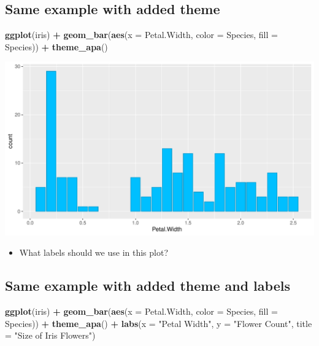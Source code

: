 \documentclass[
]{book}
\newenvironment{Shaded}{\begin{snugshade}}{\end{snugshade}}
\newcommand{\AttributeTok}[1]{\textcolor[rgb]{0.13,0.29,0.53}{#1}}
\newcommand{\FunctionTok}[1]{\textcolor[rgb]{0.13,0.29,0.53}{\textbf{#1}}}
\newcommand{\NormalTok}[1]{#1}
\newcommand{\SpecialCharTok}[1]{\textcolor[rgb]{0.81,0.36,0.00}{\textbf{#1}}}
\newcommand{\StringTok}[1]{\textcolor[rgb]{0.31,0.60,0.02}{#1}}
\providecommand{\tightlist}{%
  \setlength{\itemsep}{0pt}\setlength{\parskip}{0pt}}
\begin{document}
\subsection{Same example with added theme}\label{same-example-with-added-theme}

\begin{Shaded}
\begin{Highlighting}[]
\FunctionTok{ggplot}\NormalTok{(iris) }\SpecialCharTok{+} 
  \FunctionTok{geom\_bar}\NormalTok{(}\FunctionTok{aes}\NormalTok{(}\AttributeTok{x =}\NormalTok{ Petal.Width, }\AttributeTok{color =}\NormalTok{ Species, }\AttributeTok{fill =}\NormalTok{ Species)) }\SpecialCharTok{+}
  \FunctionTok{theme\_apa}\NormalTok{()}
\end{Highlighting}
\end{Shaded}

\begin{flushleft}\includegraphics{_main_files/figure-latex/unnamed-chunk-49-1} \end{flushleft}

\begin{itemize}
\tightlist
\item
  What labels should we use in this plot?
\end{itemize}

\subsection{Same example with added theme and labels}\label{same-example-with-added-theme-and-labels}

\begin{Shaded}
\begin{Highlighting}[]
\FunctionTok{ggplot}\NormalTok{(iris) }\SpecialCharTok{+} 
  \FunctionTok{geom\_bar}\NormalTok{(}\FunctionTok{aes}\NormalTok{(}\AttributeTok{x =}\NormalTok{ Petal.Width, }\AttributeTok{color =}\NormalTok{ Species, }\AttributeTok{fill =}\NormalTok{ Species)) }\SpecialCharTok{+}
  \FunctionTok{theme\_apa}\NormalTok{() }\SpecialCharTok{+}
  \FunctionTok{labs}\NormalTok{(}\AttributeTok{x =} \StringTok{"Petal Width"}\NormalTok{, }\AttributeTok{y =} \StringTok{"Flower Count"}\NormalTok{,}
       \AttributeTok{title =} \StringTok{"Size of Iris Flowers"}\NormalTok{)}
\end{Highlighting}
\end{Shaded}
\end{document}
